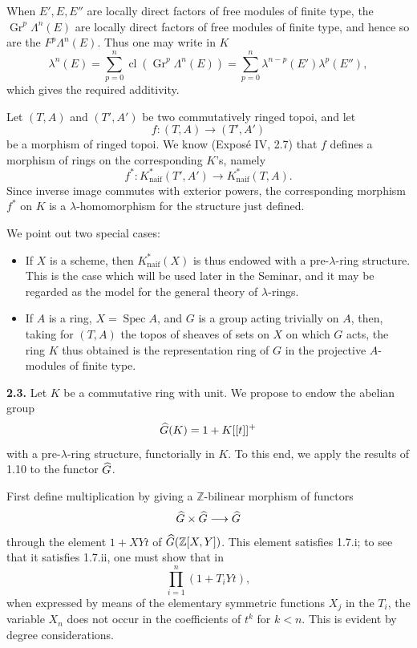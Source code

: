 \documentclass[11pt]{article}
\begin{document}
When \(E',E,E''\) are locally direct factors of free modules of finite type, the \(\operatorname{Gr}^p\Lambda^n(E)\) are locally direct factors of free modules of finite type, and hence so are the \(F^p\Lambda^n(E)\). Thus one may write in \(K\)
\[
  \lambda^n(E)=\sum_{p=0}^{n}\operatorname{cl}(\operatorname{Gr}^p\Lambda^n(E))
  =
  \sum_{p=0}^{n}\lambda^{n-p}(E')\lambda^p(E''),
\]
which gives the required additivity.

Let \((T,A)\) and \((T',A')\) be two commutatively ringed topoi, and let
\[
  f:(T,A)\longrightarrow (T',A')
\]
be a morphism of ringed topoi. We know (Exposé IV, 2.7) that \(f\) defines a morphism of rings on the corresponding \(K\)'s, namely
\[
  f^*:K^*_{\mathrm{naif}}(T',A')\longrightarrow K^*_{\mathrm{naif}}(T,A).
\]
Since inverse image commutes with exterior powers, the corresponding morphism \(f^*\) on \(K\) is a \(\lambda\)-homomorphism for the structure just defined.

We point out two special cases:
\begin{itemize}
\item If \(X\) is a scheme, then \(K^*_{\mathrm{naif}}(X)\) is thus endowed with a pre-\(\lambda\)-ring structure. This is the case which will be used later in the Seminar, and it may be regarded as the model for the general theory of \(\lambda\)-rings.
\item If \(A\) is a ring, \(X=\operatorname{Spec}A\), and \(G\) is a group acting trivially on \(A\), then, taking for \((T,A)\) the topos of sheaves of sets on \(X\) on which \(G\) acts, the ring \(K\) thus obtained is the representation ring of \(G\) in the projective \(A\)-modules of finite type.
\end{itemize}

\textbf{2.3.} Let \(K\) be a commutative ring with unit. We propose to endow the abelian group
\[
  \widehat G(K)=1+K[[t]]^+
\]
with a pre-\(\lambda\)-ring structure, functorially in \(K\). To this end, we apply the results of 1.10 to the functor \(\widehat G\).

First define multiplication by giving a \(\mathbb Z\)-bilinear morphism of functors
\[
  \widehat G\times\widehat G\longrightarrow\widehat G
\]
through the element \(1+XYt\) of \(\widehat G(\mathbb Z[X,Y])\). This element satisfies 1.7.i; to see that it satisfies 1.7.ii, one must show that in
\[
  \prod_{i=1}^{n}(1+T_iYt),
\]
when expressed by means of the elementary symmetric functions \(X_j\) in the \(T_i\), the variable \(X_n\) does not occur in the coefficients of \(t^k\) for \(k<n\). This is evident by degree considerations.
\end{document}
